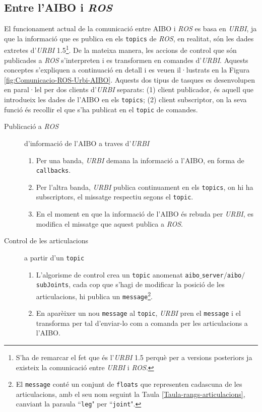\documentclass[12pt,a4paper,final,twoside]{report}
\begin{document}
\subsection{Entre l'AIBO i \textit{ROS}}

El funcionament actual de la comunicació entre AIBO i \textit{ROS} es basa en \textit{URBI}, ja que la informació que es publica en els \texttt{topics} de \textit{ROS}, en realitat, són les dades extretes d'\textit{URBI} 1.5\footnote{S'ha de remarcar el fet que és l'\textit{URBI} 1.5 perquè per a versions posteriors ja existeix la comunicació entre \textit{URBI} i \textit{ROS}.}. De la mateixa manera, les accions de control que són publicades a \textit{ROS} s'interpreten i es transformen en comandes d'\textit{URBI}. Aquests conceptes s'expliquen a continuació en detall i es veuen il·lustrats en la Figura \ref{fig:Comunicacio-ROS-Urbi-AIBO}. Aquests dos tipus de tasques es desenvolupen en paral·lel per dos clients d'\textit{URBI} separats: (1) client publicador, és aquell que introdueix les dades de l'AIBO en els \texttt{topics}; (2) client subscriptor, on la seva funció és recollir el que s'ha publicat en el \texttt{topic} de comandes.

\begin{description}

\item[Publicació a \textit{ROS}] d'informació de l'AIBO a traves d'\textit{URBI}
\begin{enumerate}
\item Per una banda, \textit{URBI} demana la informació a l'AIBO, en forma de \texttt{callbacks}.
\item Per l'altra banda, \textit{URBI} publica continuament en els \texttt{topics}, on hi ha subscriptors, el missatge respectiu segons el \texttt{topic}.
\item En el moment en que la informació de l'AIBO és rebuda per \textit{URBI}, es modifica el missatge que aquest publica a \textit{ROS}.
\end{enumerate}

\item[Control de les articulacions] a partir d'un \texttt{topic}
\begin{enumerate}
\item L'algorisme de control crea un \texttt{topic} anomenat \texttt{aibo$\_$server$/$aibo$/$subJoints}, cada cop que s'hagi de modificar la posició de les articulacions, hi publica un \texttt{message}\footnote{El \texttt{message} conté un conjunt de \texttt{floats} que representen cadascuna de les articulacions, amb el seu nom seguint la Taula \ref{Taula-rangs-articulacions}, canviant la paraula ``\texttt{leg}" per ``\texttt{joint}".}.
\item En aparèixer un nou \texttt{message} al \texttt{topic}, \textit{URBI} pren el \texttt{message} i el transforma per tal d'enviar-lo com a comanda per les articulacions a l'AIBO.  
\end{enumerate}

\end{description}
\end{document}

